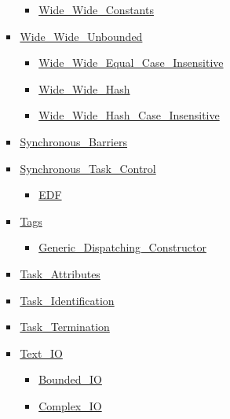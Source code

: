 \begin{scriptsize}
\begin{multicols*}{\columnnr}
\begin{itemize}[leftmargin=0mm]
\begin{itemize}[leftmargin=5mm]
\begin{itemize}[leftmargin=5mm]
\begin{itemize}[leftmargin=5mm]
	  \item[] \href{http://www.ada-auth.org/standards/22rm/html/RM-A-4-8.html}{Wide\_Wide\_Constants}
	  \end{itemize}
	\item[] \href{http://www.ada-auth.org/standards/22rm/html/RM-A-4-8.html}{Wide\_Wide\_Unbounded}
	  \begin{itemize}[leftmargin=5mm]
	  \item[] \href{http://www.ada-auth.org/standards/22rm/html/RM-A-4-8.html}{Wide\_Wide\_Equal\_Case\_Insensitive}
	  \item[] \href{http://www.ada-auth.org/standards/22rm/html/RM-A-4-8.html}{Wide\_Wide\_Hash}
	  \item[] \href{http://www.ada-auth.org/standards/22rm/html/RM-A-4-8.html}{Wide\_Wide\_Hash\_Case\_Insensitive}
	  \end{itemize}
	\item[] \href{http://www.ada-auth.org/standards/22rm/html/RM-D-10-1.html}{Synchronous\_Barriers}
	\item[] \href{http://www.ada-auth.org/standards/22rm/html/RM-D-10.html}{Synchronous\_Task\_Control}
	  \begin{itemize}[leftmargin=5mm]
	  \item[] \href{http://www.ada-auth.org/standards/22rm/html/RM-D-10.html}{EDF}
	  \end{itemize}
	\item[] \href{http://www.ada-auth.org/standards/22rm/html/RM-3-9.html}{Tags}
	  \begin{itemize}[leftmargin=5mm]
	  \item[] \href{http://www.ada-auth.org/standards/22rm/html/RM-3-9.html}{Generic\_Dispatching\_Constructor}
	  \end{itemize}
	\item[] \href{http://www.ada-auth.org/standards/22rm/html/RM-C-7-2.html}{Task\_Attributes}
	\item[] \href{http://www.ada-auth.org/standards/22rm/html/RM-C-7-1.html}{Task\_Identification}
	\item[] \href{http://www.ada-auth.org/standards/22rm/html/RM-C-7-3.html}{Task\_Termination}
	\item[] \href{http://www.ada-auth.org/standards/22rm/html/RM-A-10-1.html}{Text\_IO}
	  \begin{itemize}[leftmargin=5mm]
	  \item[] \href{http://www.ada-auth.org/standards/22rm/html/RM-A-10-11.html}{Bounded\_IO}
	  \item[] \href{http://www.ada-auth.org/standards/22rm/html/RM-G-1-3.html}{Complex\_IO}

\end{itemize}
\end{itemize}
\end{itemize}
\end{itemize}
\end{multicols*}
\end{scriptsize}
